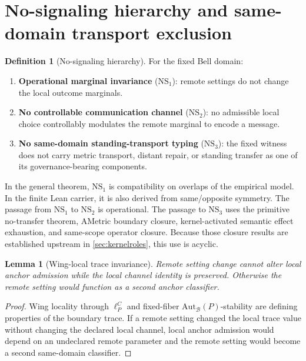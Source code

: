 \documentclass[11pt]{article}
\newtheorem{lemma}[theorem]{Lemma}
\theoremstyle{definition}
\newtheorem{definition}[theorem]{Definition}
\newcommand{\Bell}{\mathcal{B}}
\newcommand{\NSone}{\mathrm{NS}_{1}}
\newcommand{\NStwo}{\mathrm{NS}_{2}}
\newcommand{\NSthree}{\mathrm{NS}_{3}}
\newcommand{\AutBell}{\mathrm{Aut}_{\Bell}(P)}
\begin{document}
\section{No-signaling hierarchy and same-domain transport exclusion}\label{sec:nosignaling}

\begin{definition}[No-signaling hierarchy]\label{def:nshierarchy}
For the fixed Bell domain:
\begin{enumerate}[label=(NS\arabic*),leftmargin=3.2em]
\item \textbf{Operational marginal invariance} ($\NSone$): remote settings do not change the local outcome marginals.
\item \textbf{No controllable communication channel} ($\NStwo$): no admissible local choice controllably modulates the remote marginal to encode a message.
\item \textbf{No same-domain standing-transport typing} ($\NSthree$): the fixed witness does not carry metric transport, distant repair, or standing transfer as one of its governance-bearing components.
\end{enumerate}
\end{definition}

In the general theorem, $\NSone$ is compatibility on overlaps of the empirical model. In the finite Lean carrier, it is also derived from same/opposite symmetry. The passage from $\NSone$ to $\NStwo$ is operational. The passage to $\NSthree$ uses the primitive no-transfer theorem, AMetric boundary closure, kernel-activated semantic effect exhaustion, and same-scope operator closure. Because those closure results are established upstream in \cref{sec:kernelroles}, this use is acyclic.

\begin{lemma}[Wing-local trace invariance]\label{lem:channelinvariance}
Remote setting change cannot alter local anchor admission while the local channel identity is preserved. Otherwise the remote setting would function as a second anchor classifier.
\end{lemma}

\begin{proof}
Wing locality through $\ell_P^C$ and fixed-fiber $\AutBell$-stability are defining properties of the boundary trace. If a remote setting changed the local trace value without changing the declared local channel, local anchor admission would depend on an undeclared remote parameter and the remote setting would become a second same-domain classifier.
\end{proof}
\end{document}
